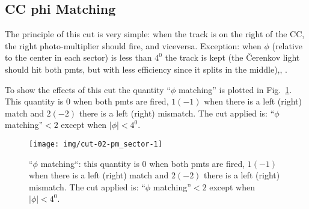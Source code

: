 \clearpage\newpage

\subsection{CC phi Matching}
The principle of this cut is very simple: when the track is on the right of the CC, the right
photo-multiplier should fire, and viceversa. Exception: when $\phi$ (relative to the center
in each sector) is less than $4^0$ the track is kept (the \v Cerenkov light should hit both
pmts, but with less efficiency since it splits in the middle)\cite{bib:ccmatch},\cite{bib:pc_fxpun}, \cite{bib:pc_osi}.

To show the effects of this cut the quantity ``$\phi$ matching'' is plotted in
Fig.~\ref{fig:ccm_phi}. This quantity is $0$ when both pmts are fired, $1(-1)$ when
there is a left (right) match and $2(-2)$ there is a left (right) mismatch.
The cut applied is: ``$\phi$ matching''$<2$ except when $|\phi|<4^0$.




\begin{figure}[ht]
    \centering
    \texttt{[image: img/cut-02-pm\_sector-1]}
    \caption{``$\phi$ matching``: this quantity is $0$ when both pmts are fired, $1(-1)$ when
    there is a left (right) match and $2(-2)$ there is a left (right) mismatch.
    The cut applied is: ``$\phi$ matching''$<2$ except when $|\phi|<4^0$.}
    \label{fig:ccm_phi}
\end{figure}

